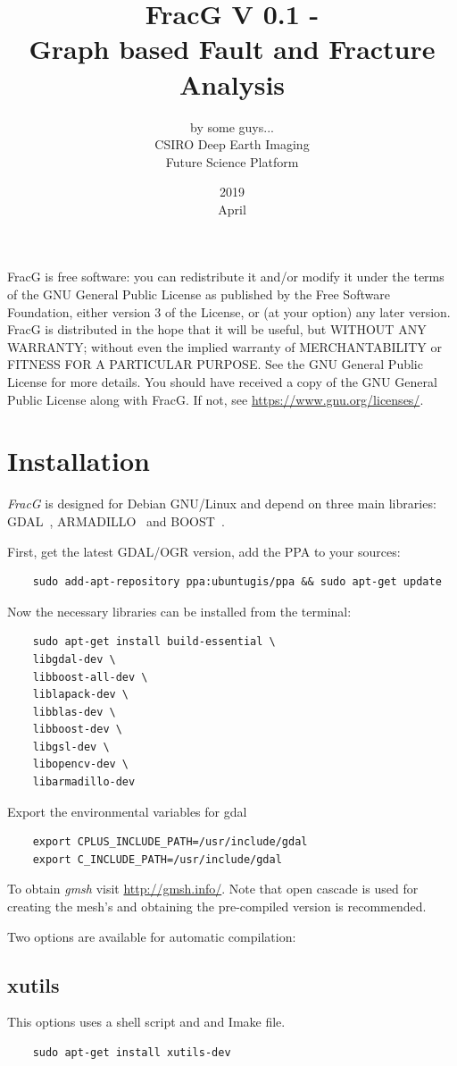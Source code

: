 \documentclass[10pt,a4paper]{article}
\title{\textbf{FracG V 0.1} - \\
Graph based Fault and Fracture Analysis}
\date{2019\\ April}
\author{by some guys...  \\
{\small CSIRO Deep Earth Imaging }\\
{\small Future Science Platform}}
\begin{document}
\maketitle
\newpage
\tableofcontents
\vspace*{\fill}
FracG is free software: you can redistribute it and/or modify
it under the terms of the GNU General Public License as published by
the Free Software Foundation, either version 3 of the License, or
(at your option) any later version.
FracG is distributed in the hope that it will be useful,
but WITHOUT ANY WARRANTY; without even the implied warranty of
MERCHANTABILITY or FITNESS FOR A PARTICULAR PURPOSE.  
See the GNU General Public License for more details.
You should have received a copy of the GNU General Public License along with FracG.  
If not, see \url{https://www.gnu.org/licenses/}.

\newpage
\section{Installation}
\textit{FracG} is designed for Debian GNU/Linux and depend on three main libraries: GDAL~\cite{gdal18}, ARMADILLO~\cite{san16} and BOOST~\cite{sie02, geh16}.

First, get the latest GDAL/OGR version, add the PPA to your sources:
\begin{verbatim}
	sudo add-apt-repository ppa:ubuntugis/ppa && sudo apt-get update
\end{verbatim}

Now the necessary libraries can be installed from the terminal:
\begin{verbatim}	
	sudo apt-get install build-essential \
	libgdal-dev \
	libboost-all-dev \
	liblapack-dev \
	libblas-dev \ 
	libboost-dev \
	libgsl-dev \
	libopencv-dev \
	libarmadillo-dev 
\end{verbatim}

Export the environmental variables for gdal 
\begin{verbatim}	
	export CPLUS_INCLUDE_PATH=/usr/include/gdal
	export C_INCLUDE_PATH=/usr/include/gdal
\end{verbatim}

To obtain \textit{gmsh} visit \url{http://gmsh.info/}. Note that open cascade is used for creating the mesh's and obtaining the pre-compiled version is recommended.

Two options are available for automatic compilation:

\subsection{xutils}
This options uses a shell script and and Imake file.
\begin{verbatim}
	sudo apt-get install xutils-dev 
\end{verbatim}
\end{document}
